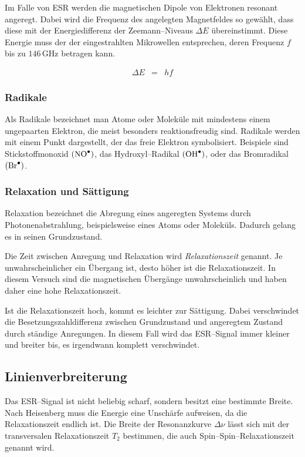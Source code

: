 \documentclass[12pt,a4paper]{scrartcl}
\numberwithin{equation}{section} %
\begin{document}
Im Falle von ESR werden die magnetischen Dipole von Elektronen resonant angeregt. Dabei wird die Frequenz des angelegten Magnetfeldes so gewählt, dass diese mit der Energiedifferenz der Zeemann--Niveaus $\Delta E$ übereinstimmt. Diese Energie muss der der eingestrahlten Mikrowellen entsprechen, deren Frequenz $f$ bis zu $146 \mathrm{\,GHz}$ betragen kann.

\begin{eqnarray}
	 \Delta E &=& hf
\end{eqnarray}

\subsubsection{Radikale}
\label{Radikale}

Als Radikale bezeichnet man Atome oder Moleküle mit mindestens einem ungepaarten Elektron, die meist besonders reaktionsfreudig sind. Radikale werden mit einem Punkt dargestellt, der das freie Elektron symbolisiert. Beispiele sind Stickstoffmonoxid $(\ce{NO^\bullet})$, das Hydroxyl--Radikal $(\ce{OH^\bullet})$, oder das Bromradikal $(\ce{Br^\bullet})$. \cite{Radikale}

\subsubsection{Relaxation und Sättigung}
Relaxation bezeichnet die Abregung eines angeregten Systems durch Photonenabstrahlung, beispielsweise eines Atoms oder Moleküls. Dadurch gelang es in seinen Grundzustand.

Die Zeit zwischen Anregung und Relaxation wird \emph{Relaxationszeit} genannt. Je unwahrscheinlicher ein Übergang ist, desto höher ist die Relaxationszeit. In diesem Versuch sind die magnetischen Übergänge unwahrscheinlich und haben daher eine hohe Relaxationszeit.

Ist die Relaxationszeit hoch, kommt es leichter zur Sättigung. Dabei verschwindet die Besetzungszahldifferenz zwischen Grundzustand und angeregtem Zustand durch ständige Anregungen. \cite{Oldenburg} In diesem Fall wird das ESR--Signal immer kleiner und breiter bis, es irgendwann komplett verschwindet.

\subsection{Linienverbreiterung}
Das ESR--Signal ist nicht beliebig scharf, sondern besitzt eine bestimmte Breite. Nach Heisenberg muss die Energie eine Unschärfe aufweisen, da die Relaxationszeit endlich ist. Die Breite der Resonanzkurve $\Delta \nu $ lässt sich mit der transversalen Relaxationszeit $T_2$ bestimmen, die auch Spin--Spin--Relaxationszeit genannt wird.
\end{document}
